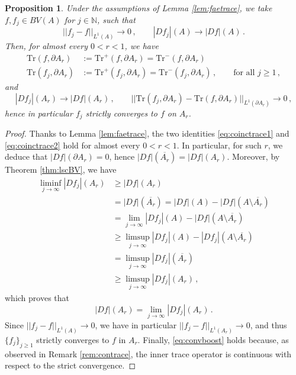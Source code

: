 \documentclass[a4paper,reqno,11pt]{amsart}
\newtheorem{proposition}[theorem]{Proposition}
\newcommand{\N}{\mathbb{N}}
\newcommand{\ra}{\rightarrow}
\newcommand{\de}{\partial}
\newcommand{\Tr}{{\mathrm{Tr}}}
\begin{document}
\begin{proposition} \label{prop:convBVboost}
Under the assumptions of Lemma \ref{lem:faetrace}, we take $f,f_{j} \in BV(A)$ for $j\in\N$, such that
\begin{equation*}
||f_j - f||_{L^1(A)} \longrightarrow 0 \, , \qquad |D f_j|(A) \longrightarrow |Df|(A) \, .
\end{equation*}
Then, for almost every $0 < r < 1$, we have
\begin{align}
\Tr(f,\de A_r) &:= \Tr^+(f,\de A_r) = \Tr^-(f,\de A_r) \label{eq:coinctrace1} \\ 
\Tr(f_j,\de A_r) &:= \Tr^+(f_j,\de A_r) = \Tr^-(f_j,\de A_r) \, , \qquad \text{for all $j \geq 1 \, ,$} \label{eq:coinctrace2}
\end{align}
and 
\begin{equation} \label{eq:convboost}
|Df_j|(A_r) \longrightarrow |Df|(A_r) \, , \qquad ||\Tr(f_j,\de A_r) - \Tr(f,\de A_r)||_{L^1(\partial A_{r})} \longrightarrow 0 \, ,
\end{equation}
hence in particular $f_{j}$ strictly converges to $f$ on $A_{r}$.
\end{proposition}

\begin{proof}
Thanks to Lemma \ref{lem:faetrace}, the two identities \eqref{eq:coinctrace1} and \eqref{eq:coinctrace2} hold for almost every $0<r<1$. In particular, for such $r$, we deduce that $|Df|(\de A_{r}) = 0$, hence $|Df|(\overline{A_{r}}) = |Df|(A_{r})$. Moreover, by Theorem \ref{thm:lscBV}, we have
\begin{align*}
\liminf_{j \ra \infty} |Df_j|(A_{r}) &\geq |Df|(A_{r})\\ 
		& =|Df|(\overline{A_{r}}) =  |Df|(A) - |Df|(A \setminus \overline{A_{r}}) \\
		& = \lim_{j \ra \infty} |Df_j|(A) - |Df|(A \setminus \overline{A_{r}}) \\
		& \geq \limsup_{j \ra \infty} |Df_j|(A) - |Df_j|(A \setminus \overline{A_{r}}) \\
		& = \limsup_{j \ra \infty} |Df_j|(\overline{A_{r}}) \\
		& \geq \limsup_{j \ra \infty} |Df_j|(A_{r}) \, ,
\end{align*}
which proves that
\begin{equation*}
|Df|(A_{r}) = \lim_{j \ra \infty} |Df_j|(A_{r}) \, .
\end{equation*}
Since $||f_j - f||_{L^1(A)} \rightarrow 0$, we have in particular $||f_j - f||_{L^1(A_{r})} \rightarrow 0$, and thus $\{ f_j \}_{j \geq 1}$ strictly converges to $f$ in $A_{r}$. Finally, \eqref{eq:convboost} holds because, as observed in Remark \ref{rem:contrace}, the inner trace operator is continuous with respect to the strict convergence.
\end{proof}	
\end{document}
